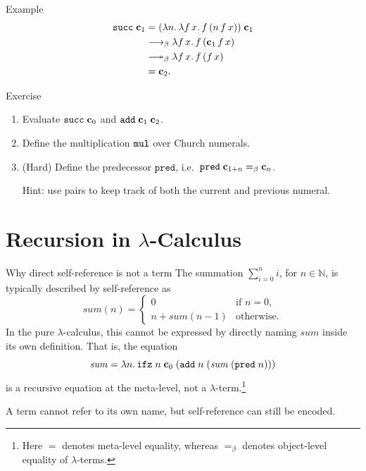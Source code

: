 \begin{frame}{Example}
  \begin{align*}
    \mathtt{succ}\;\bc_1
    &= (\lambda n.\,\lambda f\,x.\,f\,(n\,f\,x))\;\bc_1 \\
    &\onereduce \lambda f\,x.\,f\,(\bc_1\,f\,x) \\
    &\reduce \lambda f\,x.\,f\,(f\,x) \\
    &= \bc_2.
  \end{align*}
\end{frame}


\begin{frame}{Exercise}
  \begin{enumerate}
    \item Evaluate $\mathtt{succ}\;\mathbf{c}_0$ and $\mathtt{add}\;\mathbf{c}_1\;\mathbf{c}_2$.
    \item Define the multiplication $\mathtt{mul}$ over Church numerals.
    \item (Hard) Define the predecessor $\mathtt{pred}$, i.e.\ $\mathtt{pred}\;\mathbf{c}_{1+n} =_\beta \mathbf{c}_n$.

      Hint: use pairs to keep track of both the current and previous numeral.
  \end{enumerate}
\end{frame}

\section{Recursion in \texorpdfstring{$\lambda$}{λ}-Calculus}

\begin{frame}{Why direct self-reference is not a term}
  The summation $\sum_{i=0}^{n} i$, for $n \in \mathbb{N}$, is typically
  described by self-reference as
  \[
    \mathit{sum}(n) =
      \begin{cases}
        0 & \text{if } n = 0, \\
        n + \mathit{sum}(n - 1) & \text{otherwise}.
      \end{cases}
  \]
  In the pure $\lambda$-calculus, this cannot be expressed by directly naming
  $\mathit{sum}$ inside its own definition. That is, the equation
  \[
    \mathit{sum} = \lambda n.\,\mathtt{ifz}\;n\;\mathbf{c}_0\;(\mathtt{add}\;n\;(\mathit{sum}\;(\mathtt{pred}\;n)))
  \]
  is a recursive equation at the meta-level, not a $\lambda$-term.\footnote{%
    Here $=$ denotes meta-level equality, whereas $=_\beta$ denotes object-level
equality of $\lambda$-terms.}
  \medskip

  A term cannot refer to its own name, but self-reference can still be encoded.

\end{frame}

